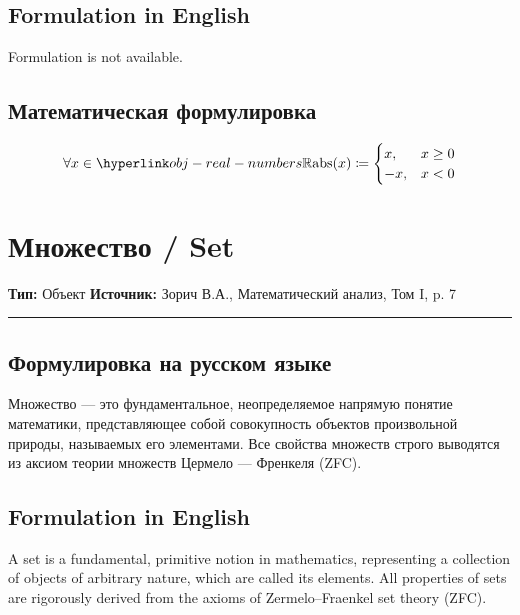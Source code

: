 \documentclass[12pt,a4paper]{report}
\begin{document}
\hypertarget{op-abs-abstract}{}
\hypertarget{op-abs-abstract}{}

\section*{Formulation in English}
Formulation is not available.

\section*{Математическая формулировка}
\begin{operation}
\[
\mForall{x \in \entityref{obj-real-numbers}{\mathbb{R}}}
\mathrm{abs}(x) \mDefinedAs
\begin{cases}
x, & x \geq 0 \\
-x, & x < 0
\end{cases}
\]
\end{operation}

\chapter{Множество / Set}\label{entity:obj-set}
\textbf{Тип:} Объект \hfill \textbf{Источник:} Зорич В.А., Математический анализ, Том I, p. 7

\vspace{0.5em}
\hrule
\vspace{1em}

\section*{Формулировка на русском языке}
Множество — это фундаментальное, неопределяемое напрямую понятие математики, представляющее собой совокупность объектов произвольной природы, называемых его элементами. Все свойства множеств строго выводятся из аксиом теории множеств Цермело — Френкеля (ZFC).

\section*{Formulation in English}
A set is a fundamental, primitive notion in mathematics, representing a collection of objects of arbitrary nature, which are called its elements. All properties of sets are rigorously derived from the axioms of Zermelo–Fraenkel set theory (ZFC).
\end{document}
